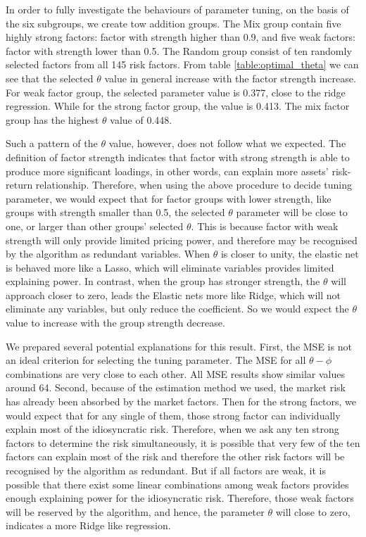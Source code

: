 In order to fully investigate the behaviours of parameter tuning, on the basis of the six subgroups, we create tow addition groups.
The Mix group contain five highly strong factors: factor with strength higher than 0.9, and five weak factors: factor with strength lower than 0.5.
The Random group consist of ten randomly selected factors from all 145 risk factors.
From table \ref{table:optimal_theta} we can see that the selected $\theta$ value in general increase with the factor strength increase.
For weak factor group, the selected parameter value is 0.377, close to the ridge regression.
While for the strong factor group, the value is 0.413.
The mix factor group has the highest $\theta$ value of 0.448.

Such a pattern of the $\theta$ value, however, does not follow what we expected.
The definition of factor strength indicates that factor with strong strength is able to produce more significant loadings, in other words, can explain more assets' risk-return relationship.
Therefore, when using the above procedure to decide tuning parameter, we would expect that for factor groups with lower strength, like groups with strength smaller than 0.5, the selected $\theta$ parameter will be close to one, or larger than other groups' selected $\theta$.
This is because factor with weak strength will only provide limited pricing power, and therefore may be recognised by the algorithm as redundant variables.
When $\theta$ is closer to unity, the elastic net is behaved more like a Lasso, which will eliminate variables provides limited explaining power.
In contrast, when the group has stronger strength, the $\theta$ will approach closer to zero, leads the Elastic nets more like Ridge, which will not eliminate any variables, but only reduce the coefficient.
So we would expect the $\theta$ value to increase with the group strength decrease.

We prepared several potential explanations for this result.
First, the MSE is not an ideal criterion for selecting the tuning parameter.
The MSE for all $\theta - \phi$ combinations are very close to each other.
All MSE results show similar values around 64.
Second, because of the estimation method we used, the market risk has already been absorbed by the market factors.
Then for the strong factors, we would expect that for any single of them, those strong factor can individually explain most of the idiosyncratic risk.
Therefore, when we ask any ten strong factors to determine the risk simultaneously, it is possible that very few of the ten factors can explain most of the risk and therefore the other risk factors will be recognised by the algorithm as redundant.
But if all factors are weak, it is possible that there exist some linear combinations among weak factors provides enough explaining power for the idiosyncratic risk.
Therefore, those weak factors will be reserved by the algorithm, and hence, the parameter $\theta$ will close to zero, indicates a more Ridge like regression.





